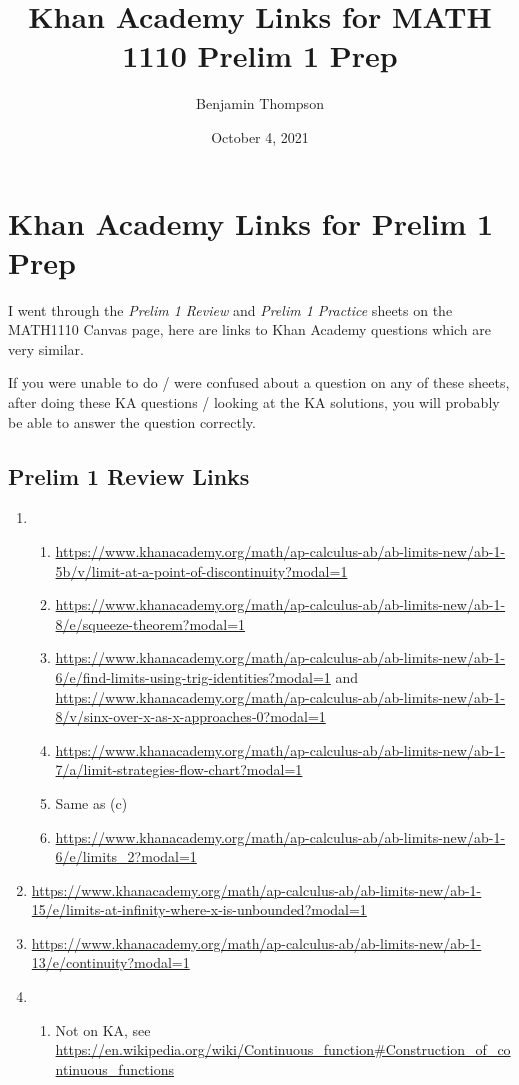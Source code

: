 \documentclass[a4paper,12pt]{article}
\title{Khan Academy Links for MATH 1110 Prelim 1 Prep}
\author{Benjamin Thompson}
\date{October 4, 2021}
\begin{document}
\section*{Khan Academy Links for Prelim 1 Prep}
I went through the \emph{Prelim 1 Review} and \emph{Prelim 1 Practice} sheets on the MATH1110 Canvas page, here are links to Khan Academy questions which are very similar.

If you were unable to do / were confused about a question on any of these sheets, after doing these KA questions / looking at the KA solutions, you will probably be able to answer the question correctly.

\subsection*{Prelim 1 Review Links}
\begin{enumerate}\item \begin{enumerate}
  \item \url{https://www.khanacademy.org/math/ap-calculus-ab/ab-limits-new/ab-1-5b/v/limit-at-a-point-of-discontinuity?modal=1}
  \item \url{https://www.khanacademy.org/math/ap-calculus-ab/ab-limits-new/ab-1-8/e/squeeze-theorem?modal=1}
  \item \url{https://www.khanacademy.org/math/ap-calculus-ab/ab-limits-new/ab-1-6/e/find-limits-using-trig-identities?modal=1} and \url{https://www.khanacademy.org/math/ap-calculus-ab/ab-limits-new/ab-1-8/v/sinx-over-x-as-x-approaches-0?modal=1}
  \item \url{https://www.khanacademy.org/math/ap-calculus-ab/ab-limits-new/ab-1-7/a/limit-strategies-flow-chart?modal=1}
  \item Same as (c)
  \item \url{https://www.khanacademy.org/math/ap-calculus-ab/ab-limits-new/ab-1-6/e/limits_2?modal=1}
  \end{enumerate}
\item \url{https://www.khanacademy.org/math/ap-calculus-ab/ab-limits-new/ab-1-15/e/limits-at-infinity-where-x-is-unbounded?modal=1}
\item \url{https://www.khanacademy.org/math/ap-calculus-ab/ab-limits-new/ab-1-13/e/continuity?modal=1}
\item \begin{enumerate}
\item Not on KA, see \url{https://en.wikipedia.org/wiki/Continuous_function#Construction_of_continuous_functions}

\end{enumerate}
\end{enumerate}
\end{document}
